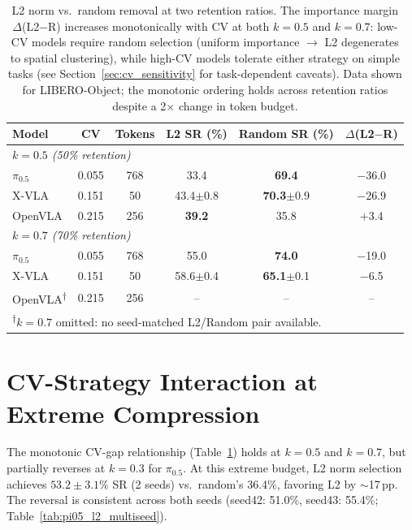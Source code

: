 \begin{table}[ht]
\centering
\small
\caption{L2 norm vs.\ random removal at two retention ratios. The importance margin $\Delta$(L2$-$R) increases monotonically with CV at both $k{=}0.5$ and $k{=}0.7$: low-CV models require random selection (uniform importance $\rightarrow$ L2 degenerates to spatial clustering), while high-CV models tolerate either strategy on simple tasks (see Section~\ref{sec:cv_sensitivity} for task-dependent caveats). Data shown for LIBERO-Object; the monotonic ordering holds across retention ratios despite a 2$\times$ change in token budget.}
\label{tab:scaling_law}
\begin{tabular}{lccccc}
\toprule
Model & CV & Tokens & L2 SR (\%) & Random SR (\%) & $\Delta$(L2$-$R) \\
\midrule
\multicolumn{6}{l}{\textit{$k{=}0.5$ (50\% retention)}} \\
$\pi_{0.5}$ & 0.055 & 768 & 33.4 & \textbf{69.4} & $-$36.0 \\
X-VLA & 0.151 & 50 & 43.4$\pm$0.8 & \textbf{70.3}$\pm$0.9 & $-$26.9 \\
OpenVLA & 0.215 & 256 & \textbf{39.2} & 35.8 & $+$3.4 \\
\midrule
\multicolumn{6}{l}{\textit{$k{=}0.7$ (70\% retention)}} \\
$\pi_{0.5}$ & 0.055 & 768 & 55.0 & \textbf{74.0} & $-$19.0 \\
X-VLA & 0.151 & 50 & 58.6$\pm$0.4 & \textbf{65.1}$\pm$0.1 & $-$6.5 \\
OpenVLA\textsuperscript{$\dagger$} & 0.215 & 256 & -- & -- & -- \\
\bottomrule
\multicolumn{6}{l}{\footnotesize\textsuperscript{$\dagger$}$k{=}0.7$ omitted: no seed-matched L2/Random pair available.}
\end{tabular}
\end{table}


\section{CV-Strategy Interaction at Extreme Compression}
\label{app:cv_strategy_interaction}

The monotonic CV-gap relationship (Table~\ref{tab:scaling_law}) holds at $k{=}0.5$ and $k{=}0.7$, but partially reverses at $k{=}0.3$ for $\pi_{0.5}$. At this extreme budget, L2 norm selection achieves $53.2 \pm 3.1$\% SR (2 seeds) vs.\ random's 36.4\%, favoring L2 by $\sim$17\,pp. The reversal is consistent across both seeds (seed42: 51.0\%, seed43: 55.4\%; Table~\ref{tab:pi05_l2_multiseed}).

